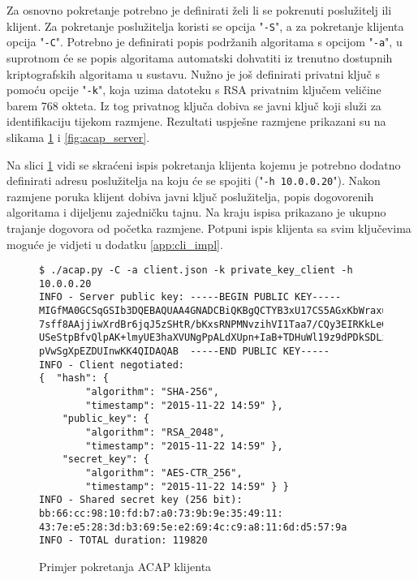 Za osnovno pokretanje potrebno je definirati želi li se pokrenuti poslužitelj
ili klijent. Za pokretanje poslužitelja koristi se opcija "\texttt{-S}", a za
pokretanje klijenta opcija "\texttt{-C}". Potrebno je definirati popis podržanih
algoritama s opcijom "\texttt{-a}", u suprotnom će se popis algoritama
automatski dohvatiti iz trenutno dostupnih kriptografskih algoritama u sustavu.
Nužno je još definirati privatni ključ s pomoću opcije "\texttt{-k}", koja uzima
datoteku s RSA privatnim ključem veličine barem 768 okteta. Iz tog
privatnog ključa dobiva se javni ključ koji služi za identifikaciju tijekom
razmjene. Rezultati uspješne razmjene prikazani su na slikama
\ref{fig:acap_client} i \ref{fig:acap_server}.

Na slici \ref{fig:acap_client} vidi se skraćeni ispis pokretanja klijenta kojemu
je potrebno dodatno definirati adresu poslužitelja na koju će se spojiti
("\texttt{-h 10.0.0.20}"). Nakon
razmjene poruka klijent dobiva javni ključ poslužitelja, popis
dogovorenih algoritama i dijeljenu zajedničku tajnu. Na kraju ispisa prikazano
je ukupno trajanje dogovora od početka razmjene. Potpuni ispis klijenta sa svim
ključevima moguće je vidjeti u dodatku \ref{app:cli_impl}.

\begin{figure}[htb]
\begin{footnotesize}
\begin{verbatim}
$ ./acap.py -C -a client.json -k private_key_client -h 10.0.0.20
INFO - Server public key: -----BEGIN PUBLIC KEY-----
MIGfMA0GCSqGSIb3DQEBAQUAA4GNADCBiQKBgQCTYB3xU17CS5AGxKbWraxuGOYb
7sff8AAjjiwXrdBr6jqJ5zSHtR/bKxsRNPMNvzihVI1Taa7/CQy3EIRKkLeG4I7M
USeStpBfvQlpAK+lmyUE3haXVUNgPpALdXUpn+IaB+TDHuWl19z9dPDkSDLzQzga
pVwSgXpEZDUInwKK4QIDAQAB  -----END PUBLIC KEY-----
INFO - Client negotiated: 
{  "hash": {
        "algorithm": "SHA-256",
        "timestamp": "2015-11-22 14:59" },
    "public_key": {
        "algorithm": "RSA_2048",
        "timestamp": "2015-11-22 14:59" },
    "secret_key": {
        "algorithm": "AES-CTR_256",
        "timestamp": "2015-11-22 14:59" } }
INFO - Shared secret key (256 bit): bb:66:cc:98:10:fd:b7:a0:73:9b:9e:35:49:11:
43:7e:e5:28:3d:b3:69:5e:e2:69:4c:c9:a8:11:6d:d5:57:9a
INFO - TOTAL duration: 119820
\end{verbatim}
\end{footnotesize}
\vspace{-15pt}
\caption{Primjer pokretanja ACAP klijenta}
\label{fig:acap_client}
\end{figure}

